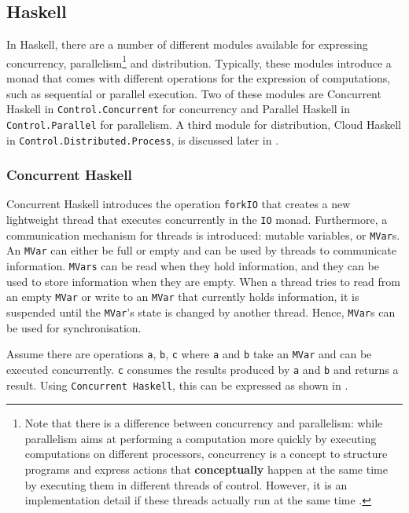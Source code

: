 \clearpage
\subsection{Haskell}
In \textsf{Haskell}, there are a number of different modules available for expressing concurrency, parallelism\footnote{Note that there is a difference between concurrency and parallelism: while parallelism aims at performing a computation more quickly by executing computations on different processors, concurrency is a concept to structure programs and express actions that \textbf{conceptually} happen at the same time by executing them in different threads of control. However, it is an implementation detail if these threads actually run at the same time \cite{Marlow}.} and distribution. Typically, these modules introduce a monad that comes with different operations for the expression of computations, such as sequential or parallel execution. Two of these modules are \textsf{Concurrent Haskell} in \texttt{Control.Concurrent} for concurrency and \textsf{Parallel Haskell} in \texttt{Control.Parallel} for parallelism. A third module for distribution, \textsf{Cloud Haskell} in \texttt{Control.Distributed.Process}, is discussed later in .

\subsubsection{Concurrent Haskell}
\textsf{Concurrent Haskell} introduces the operation \texttt{forkIO} that creates a new lightweight thread that executes concurrently in the \texttt{IO} monad. Furthermore, a communication mechanism for threads is introduced: mutable variables, or \texttt{MVar}s. An \texttt{MVar} can either be full or empty and can be used by threads to communicate information. \texttt{MVars} can be read when they hold information, and they can be used to store information when they are empty. When a thread tries to read from an empty \texttt{MVar} or write to an \texttt{MVar} that currently holds information, it is suspended until the \texttt{MVar}'s state is changed by another thread. Hence, \texttt{MVar}s can be used for synchronisation.

Assume there are operations \texttt{a}, \texttt{b}, \texttt{c} where \texttt{a} and \texttt{b} take an \texttt{MVar} and can be executed concurrently. \texttt{c} consumes the results produced by \texttt{a} and \texttt{b} and returns a result. Using \texttt{Concurrent Haskell}, this can be expressed as shown in .

